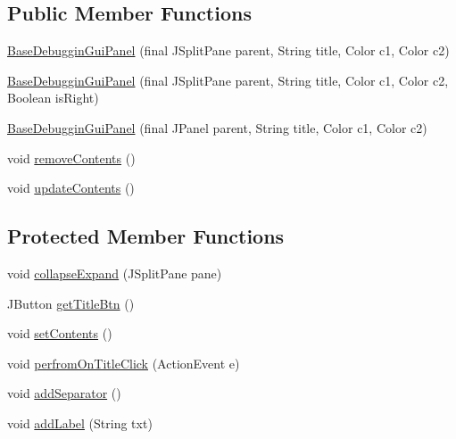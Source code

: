 \subsection*{Public Member Functions}
\begin{DoxyCompactItemize}
\item 
\hyperlink{classit_1_1emarolab_1_1cagg_1_1debugging_1_1baseComponents_1_1BaseDebugginGuiPanel_affc230d2afeaf7305f96d1103e4af5a1}{Base\-Debuggin\-Gui\-Panel} (final J\-Split\-Pane parent, String title, Color c1, Color c2)
\item 
\hyperlink{classit_1_1emarolab_1_1cagg_1_1debugging_1_1baseComponents_1_1BaseDebugginGuiPanel_a520e7c94ca4f8ba994b0df68e16061a8}{Base\-Debuggin\-Gui\-Panel} (final J\-Split\-Pane parent, String title, Color c1, Color c2, Boolean is\-Right)
\item 
\hyperlink{classit_1_1emarolab_1_1cagg_1_1debugging_1_1baseComponents_1_1BaseDebugginGuiPanel_a079e1ca4059f9ba07a00db73275febb6}{Base\-Debuggin\-Gui\-Panel} (final J\-Panel parent, String title, Color c1, Color c2)
\item 
void \hyperlink{classit_1_1emarolab_1_1cagg_1_1debugging_1_1baseComponents_1_1BaseDebugginGuiPanel_a686f505c11f03d918a9d2f90de825cc3}{remove\-Contents} ()
\item 
void \hyperlink{classit_1_1emarolab_1_1cagg_1_1debugging_1_1baseComponents_1_1BaseDebugginGuiPanel_aa72ac3018846f67f18f571f75b393e63}{update\-Contents} ()
\end{DoxyCompactItemize}
\subsection*{Protected Member Functions}
\begin{DoxyCompactItemize}
\item 
void \hyperlink{classit_1_1emarolab_1_1cagg_1_1debugging_1_1baseComponents_1_1BaseDebugginGuiPanel_acd94261db84ed04723c3deca31bc546c}{collapse\-Expand} (J\-Split\-Pane pane)
\item 
J\-Button \hyperlink{classit_1_1emarolab_1_1cagg_1_1debugging_1_1baseComponents_1_1BaseDebugginGuiPanel_ab1576f05f5ce3bd93b1281b1cb701887}{get\-Title\-Btn} ()
\item 
void \hyperlink{classit_1_1emarolab_1_1cagg_1_1debugging_1_1baseComponents_1_1BaseDebugginGuiPanel_a0a983d37297025c29ab4f33131ba1894}{set\-Contents} ()
\item 
void \hyperlink{classit_1_1emarolab_1_1cagg_1_1debugging_1_1baseComponents_1_1BaseDebugginGuiPanel_aeee1072d1dd6285a4cb9138722e9bff1}{perfrom\-On\-Title\-Click} (Action\-Event e)
\item 
void \hyperlink{classit_1_1emarolab_1_1cagg_1_1debugging_1_1baseComponents_1_1BaseDebugginGuiPanel_ab6b3ee21006fdc764a79f120423e7d7e}{add\-Separator} ()
\item 
void \hyperlink{classit_1_1emarolab_1_1cagg_1_1debugging_1_1baseComponents_1_1BaseDebugginGuiPanel_afa567e99bc4041bad795b0721e85a2ba}{add\-Label} (String txt)
\end{DoxyCompactItemize}
